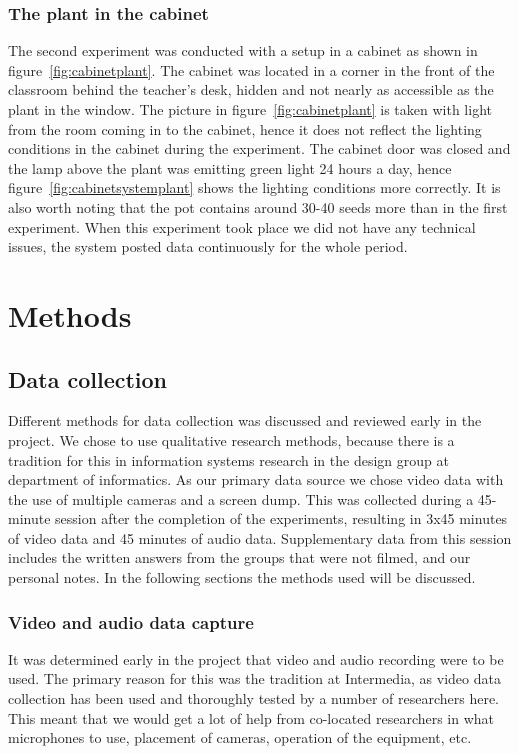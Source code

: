 \subsubsection*{The plant in the cabinet}
The second experiment was conducted with a setup in a cabinet as shown in figure~\ref{fig:cabinetplant}. The cabinet was located in a corner in the front of the classroom behind the teacher's desk, hidden and not nearly as accessible as the plant in the window. The picture in figure~\ref{fig:cabinetplant} is taken with light from the room coming in to the cabinet, hence it does not reflect the lighting conditions in the cabinet during the experiment. The cabinet door was closed and the lamp above the plant was emitting green light 24 hours a day, hence figure~\ref{fig:cabinetsystemplant} shows the lighting conditions more correctly. It is also worth noting that the pot contains around 30-40 seeds more than in the first experiment. When this experiment took place we did not have any technical issues, the system posted data continuously for the whole period.


\section{Methods}
\subsection{Data collection}
Different methods for data collection was discussed and reviewed early in the project. We chose to use qualitative research methods, because there is a tradition for this in information systems research in the design group at department of informatics. As our primary data source we chose video data with the use of multiple cameras and a screen dump. This was collected during a 45-minute session after the completion of the experiments, resulting in 3x45 minutes of video data and 45 minutes of audio data. Supplementary data from this session includes the written answers from the groups that were not filmed, and our personal notes. In the following sections the methods used will be discussed. 

\subsubsection{Video and audio data capture}
It was determined early in the project that video and audio recording were to be used. The primary reason for this was the tradition at Intermedia, as video data collection has been used and thoroughly tested by a number of researchers here. This meant that we would get a lot of help from co-located researchers in what microphones to use, placement of cameras, operation of the equipment, etc. 

